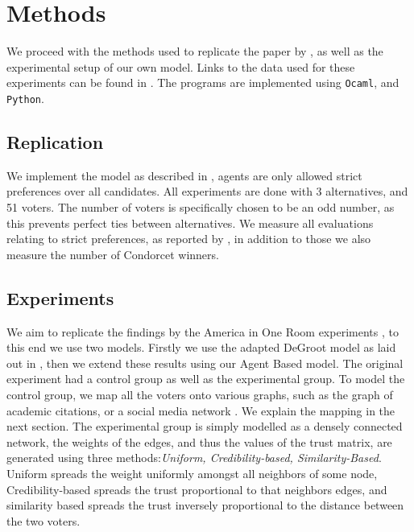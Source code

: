 \chapter{Methods}
\label{Methods}

We proceed with the methods used to replicate the paper by \citet{radDeliberationSinglePeakednessCoherent2021}, as well as the experimental setup of our own model. Links to the data used for these experiments can be found in . The programs are implemented using \texttt{Ocaml}, and \texttt{Python}.


\section{Replication}
We implement the model as described in , agents are only allowed strict preferences over all candidates. All experiments are done with 3 alternatives, and 51 voters. The number of voters is specifically chosen to be an odd number, as this prevents perfect ties between alternatives. We measure all evaluations relating to strict preferences, as reported by \citet{radDeliberationSinglePeakednessCoherent2021}, in addition to those we also measure the number of Condorcet winners.

\section{Experiments}
We aim to replicate the findings by the America in One Room experiments \cite{fishkinCanDeliberationHave2024}, to this end we use two models. Firstly we use the adapted DeGroot model as laid out in , then we extend these results using our Agent Based model. The original experiment had a control group as well as the experimental group. To model the control group, we map all the voters onto various graphs, such as the graph of academic citations, or a social media network \cite{nr}. We explain the mapping in the next section. The experimental group is simply modelled as a densely connected network, the weights of the edges, and thus the values of the trust matrix, are generated using three methods:\textit{Uniform, Credibility-based, Similarity-Based}. Uniform spreads the weight uniformly amongst all neighbors of some node, Credibility-based spreads the trust proportional to that neighbors edges, and similarity based spreads the trust inversely proportional to the distance between the two voters.

